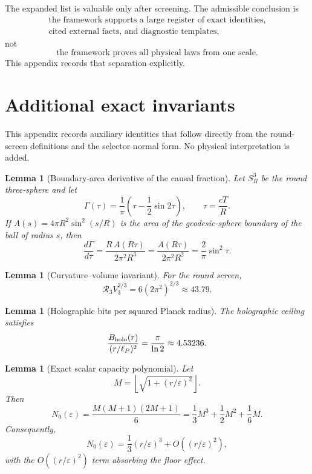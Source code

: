 \documentclass[11pt,a4paper]{article}
\newtheorem{lemma}[theorem]{Lemma}
\begin{document}
The expanded list is valuable only after screening.  The admissible conclusion is
\[
\begin{aligned}
\text{the framework supports a large register of exact identities,}\\
\text{cited external facts, and diagnostic templates,}
\end{aligned}
\]
not
\[
\text{the framework proves all physical laws from one scale}.
\]
This appendix records that separation explicitly.




\section{Additional exact invariants}
\label{app:additional-exact-invariants}

This appendix records auxiliary identities that follow directly from the round-screen definitions and the selector normal form.  No physical interpretation is added.

\begin{lemma}[Boundary-area derivative of the causal fraction]
Let \(S^3_R\) be the round three-sphere and let
\[
\Gamma(\tau)=\frac{1}{\pi}\left(\tau-\frac12\sin2\tau\right),
\qquad
\tau=\frac{cT}{R}.
\]
If \(A(s)=4\pi R^2\sin^2(s/R)\) is the area of the geodesic-sphere boundary of the ball of radius \(s\), then
\[
\frac{d\Gamma}{d\tau}
=
\frac{R\,A(R\tau)}{2\pi^2R^3}
=
\frac{A(R\tau)}{2\pi^2R^2}
=
\frac{2}{\pi}\sin^2\tau.
\]
\end{lemma}

\begin{lemma}[Curvature--volume invariant]
For the round screen,
\[
\mathcal R_3 V_3^{2/3}
=
6(2\pi^2)^{2/3}
\approx 43.79.
\]
\end{lemma}

\begin{lemma}[Holographic bits per squared Planck radius]
The holographic ceiling satisfies
\[
\frac{B_{\rm holo}(r)}{(r/\ell_P)^2}
=
\frac{\pi}{\ln2}
\approx4.53236.
\]
\end{lemma}

\begin{lemma}[Exact scalar capacity polynomial]
Let
\[
M=\left\lfloor\sqrt{1+(r/\varepsilon)^2}\right\rfloor .
\]
Then
\[
N_0(\varepsilon)
=
\frac{M(M+1)(2M+1)}6
=
\frac13M^3+\frac12M^2+\frac16M.
\]
Consequently,
\[
N_0(\varepsilon)
=
\frac13(r/\varepsilon)^3
+
O((r/\varepsilon)^2),
\]
with the \(O((r/\varepsilon)^2)\) term absorbing the floor effect.
\end{lemma}
\end{document}
